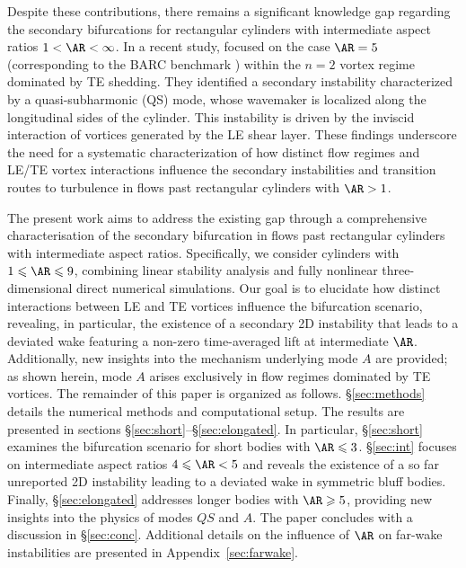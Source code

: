 %
Despite these contributions, there remains a significant knowledge gap regarding the secondary bifurcations for rectangular cylinders with intermediate aspect ratios $1 < \AR < \infty$. In a recent study, \citet{chiarini-quadrio-auteri-2022d} focused on the case $\AR=5$ (corresponding to the BARC benchmark \citep{bruno-etal-2014}) within the $n=2$ vortex regime dominated by TE shedding. They identified a secondary instability characterized by a quasi-subharmonic (QS) mode, whose wavemaker \citep{monkewitz-huerre-chomaz-1993} is localized along the longitudinal sides of the cylinder. This instability is driven by the inviscid interaction of vortices generated by the LE shear layer.
%
These findings underscore the need for a systematic characterization of how distinct flow regimes and LE/TE vortex interactions influence the secondary instabilities and transition routes to turbulence in flows past rectangular cylinders with $\AR > 1$.
    
The present work aims to address the existing gap through a comprehensive characterisation of the secondary bifurcation in flows past rectangular cylinders with intermediate aspect ratios. Specifically, we consider cylinders with $1 \leq \AR \leq 9$, combining linear stability analysis and fully nonlinear three-dimensional direct numerical simulations. Our goal is to elucidate how distinct interactions between LE and TE vortices influence the bifurcation scenario, revealing, in particular, the existence of a secondary 2D instability that leads to a deviated wake featuring a non-zero time-averaged lift at intermediate $\AR$. Additionally, new insights into the mechanism underlying mode $A$ are provided; as shown herein, mode $A$ arises exclusively in flow regimes dominated by TE vortices.
%
The remainder of this paper is organized as follows. \S\ref{sec:methods} details the numerical methods and computational setup. The results are presented in sections \S\ref{sec:short}–\S\ref{sec:elongated}. In particular, \S\ref{sec:short} examines the bifurcation scenario for short bodies with $\AR \leq 3$. \S\ref{sec:int} focuses on intermediate aspect ratios $4 \leq \AR < 5$ and reveals the existence of a so far unreported 2D instability leading to a deviated wake in symmetric bluff bodies. Finally, \S\ref{sec:elongated} addresses longer bodies with $\AR \geq 5$, providing new insights into the physics of modes $QS$ and $A$. The paper concludes with a discussion in \S\ref{sec:conc}. Additional details on the influence of $\AR$ on far-wake instabilities are presented in Appendix~\ref{sec:farwake}.
